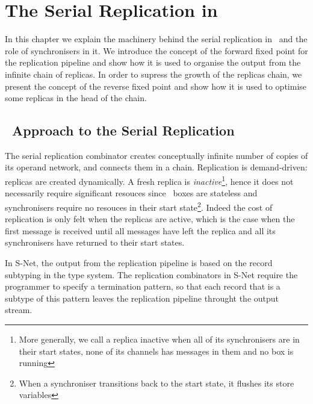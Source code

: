 \chapter{The Serial Replication in \ak\ \label{chap_sr}}
In this chapter we explain the machinery behind the serial replication in \ak\ and the role of synchronisers in it. We introduce the concept of the forward fixed point for the replication pipeline and show how it is used to organise the output from the infinite chain of replicas. In order to supress the growth of the replicas chain, we present the concept of the reverse fixed point and show how it is used to optimise some replicas in the head of the chain.

%


    \section{\ak\ Approach to the Serial Replication}
The serial replication combinator creates conceptually infinite number of copies of its operand network, and connects them in a chain. Replication is demand-driven: replicas are created dynamically. A fresh replica is \emph{inactive}\footnote{More generally, we call a replica inactive when all of its synchronisers are in their start states, none of its channels has messages in them and no box is running}, hence it does not necessarily require significant resouces since \ak\ boxes are stateless and synchronisers require no resouces in their start state\footnote{When a synchroniser transitions back to the start state, it flushes its store variables}. Indeed the cost of replication is only felt when the replicas are active, which is the case when the first message is received until all messages have left the replica and all its synchronisers have returned to their start states.

In S-Net, the output from the replication pipeline is based on the record subtyping in the type system. The replication combinators in S-Net require the programmer to specify a termination pattern, so that each record that is a subtype of this pattern leaves the replication pipeline throught the output stream.

